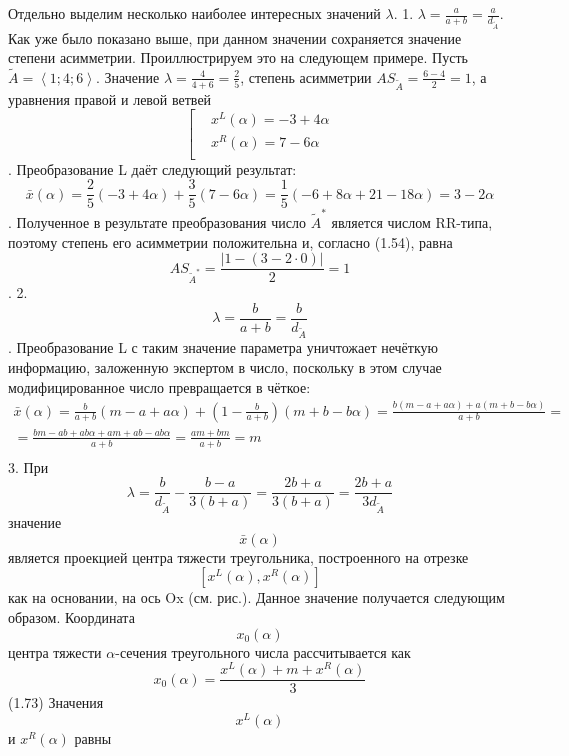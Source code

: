 Отдельно выделим несколько наиболее интересных значений $\lambda $.
1. $\lambda =\frac{a}{a+b}=\frac{a}{{{d}_{{\tilde{A}}}}}$. Как уже было показано выше, при данном значении сохраняется значение степени асимметрии.
Проиллюстрируем это на следующем примере. Пусть $\tilde{A}=\left\langle 1;4;6 \right\rangle $. Значение $\lambda =\frac{4}{4+6}=\frac{2}{5}$, степень асимметрии $A{{S}_{{\tilde{A}}}}=\frac{6-4}{2}=1$, а уравнения правой и левой ветвей
	\[\left[ \begin{aligned}
  & {{x}^{L}}\left( \alpha  \right)=-3+4\alpha  \\ 
 & {{x}^{R}}\left( \alpha  \right)=7-6\alpha  \\ 
\end{aligned} \right.\].
Преобразование L даёт следующий результат:
	\[\bar{x}\left( \alpha  \right)=\frac{2}{5}\left( -3+4\alpha  \right)+\frac{3}{5}\left( 7-6\alpha  \right)=\frac{1}{5}\left( -6+8\alpha +21-18\alpha  \right)=3-2\alpha \].
Полученное в результате преобразования число ${{\tilde{A}}^{*}}$ является числом RR-типа, поэтому степень его асимметрии положительна и, согласно (1.54), равна
	\[A{{S}_{{{{\tilde{A}}}^{*}}}}=\frac{\left| 1-\left( 3-2\cdot 0 \right) \right|}{2}=1\].
2. \[\lambda =\frac{b}{a+b}=\frac{b}{{{d}_{{\tilde{A}}}}}\]. Преобразование L с таким значение параметра уничтожает нечёткую информацию, заложенную экспертом в число, поскольку в этом случае модифицированное число превращается в чёткое:
	\[\begin{matrix}
  \bar{x}\left( \alpha  \right)=\frac{b}{a+b}\left( m-a+a\alpha  \right)+\left( 1-\frac{b}{a+b} \right)\left( m+b-b\alpha  \right)=\frac{b\left( m-a+a\alpha  \right)+a\left( m+b-b\alpha  \right)}{a+b}= \\ 
  =\frac{bm-ab+ab\alpha +am+ab-ab\alpha }{a+b}=\frac{am+bm}{a+b}=m \\ 
\end{matrix}\] 
3. При \[\lambda =\frac{b}{{{d}_{{\tilde{A}}}}}-\frac{b-a}{3\left( b+a \right)}=\frac{2b+a}{3\left( b+a \right)}=\frac{2b+a}{3{{d}_{{\tilde{A}}}}}\] значение \[\bar{x}(\alpha )\] является проекцией центра тяжести треугольника, построенного на отрезке \[\left[ {{x}^{L}}(\alpha ),{{x}^{R}}(\alpha ) \right]\] как на основании, на ось Ox (см. рис.).
Данное значение получается следующим образом. Координата \[{{x}_{0}}\left( \alpha  \right)\] центра тяжести $\alpha $-сечения треугольного числа рассчитывается как
	\[{{x}_{0}}\left( \alpha  \right)=\frac{{{x}^{L}}\left( \alpha  \right)+m+{{x}^{R}}\left( \alpha  \right)}{3}\] 	(1.73)
Значения \[{{x}^{L}}\left( \alpha  \right)\] и ${{x}^{R}}\left( \alpha  \right)$ равны
